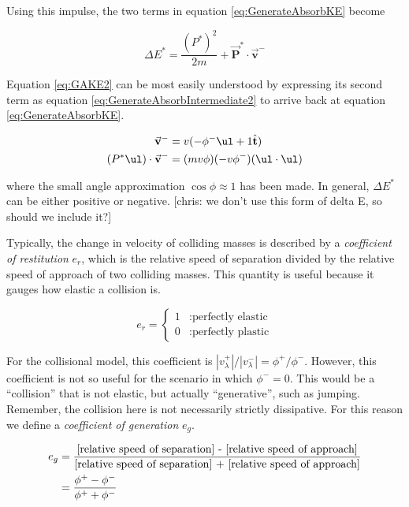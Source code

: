 Using this impulse, the two terms in equation \ref{eq:GenerateAbsorbKE} become

\begin{equation}
\Delta E^{*} = \frac{ (P^{*})^{2}}{2m} + \vec{\mathbf{P}}^{*} \cdot \vec{\mathbf{v}}^{-}
\label{eq:GAKE2}
\end{equation}

Equation \ref{eq:GAKE2} can be most easily understood by expressing its second term as equation \ref{eq:GenerateAbsorbIntermediate2} to arrive back at equation \ref{eq:GenerateAbsorbKE}.

\begin{align}
\vec{\mathbf{v}}^{-} &= v(-\phi^{-} \ul + 1\hat{\mathbf{t}}) \label{eq:GenerateAbsorbIntermediate1} \\
(P^{*} \ul) \cdot \vec{\mathbf{v}}^{-} &= (mv\phi)(-v\phi^{-})(\ul \cdot \ul) \label{eq:GenerateAbsorbIntermediate2}
\end{align}

where the small angle approximation $\cos{\phi} \approx 1$ has been made. In general, $\Delta E^{*}$ can be either positive or negative. [chris: we don't use this form of delta E, so should we include it?]

Typically, the change in velocity of colliding masses is described by a \textit{coefficient of restitution} $e_{r}$, which is the relative speed of separation divided by the relative speed of approach of two colliding masses. This quantity is useful because it gauges how elastic a collision is.

\begin{displaymath}
   e_{r} = \left\{
     \begin{array}{lr}
       1 & : \mbox{perfectly elastic}\\
       0 & : \mbox{perfectly plastic}
     \end{array}
   \right.
\end{displaymath}

For the collisional model, this coefficient is $|v_{\lambda}^{+}|/|v_{\lambda}^{-}| = \phi^{+}/\phi^{-}$. However, this coefficient is not so useful for the scenario in which $\phi^{-} = 0$. This would be a ``collision'' that is not elastic, but actually ``generative'', such as jumping. Remember, the collision here is not necessarily strictly dissipative. For this reason we define a \textit{coefficient of generation} $e_{g}$.  

\begin{align}
e_{g} &= \frac{\mbox{[relative speed of separation] - [relative speed of approach]}}{\mbox{[relative speed of separation] + [relative speed of approach]}} \notag \\
&= \frac{\phi^{+} - \phi^{-}}{\phi^{+} + \phi^{-}}
\label{eq:CoefficientOfGeneration}
\end{align}

